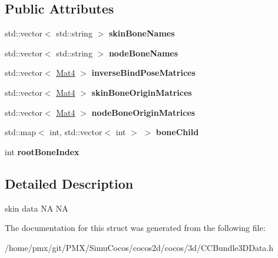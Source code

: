 \subsection*{Public Attributes}
\begin{DoxyCompactItemize}
\item 
\mbox{\label{structSkinData_ad68202d761e4163ceee9eaedf1c5d9aa}} 
std\+::vector$<$ std\+::string $>$ {\bfseries skin\+Bone\+Names}
\item 
\mbox{\label{structSkinData_a46d45c2d864ce9bc19525da8fb0fffdc}} 
std\+::vector$<$ std\+::string $>$ {\bfseries node\+Bone\+Names}
\item 
\mbox{\label{structSkinData_a1d031a1ee552e0412799c911ffc91af8}} 
std\+::vector$<$ \hyperlink{classMat4}{Mat4} $>$ {\bfseries inverse\+Bind\+Pose\+Matrices}
\item 
\mbox{\label{structSkinData_a3162edec71fbbf4b579cbbcb321f801c}} 
std\+::vector$<$ \hyperlink{classMat4}{Mat4} $>$ {\bfseries skin\+Bone\+Origin\+Matrices}
\item 
\mbox{\label{structSkinData_af56f9ccb04635b012bba68f9d6183d68}} 
std\+::vector$<$ \hyperlink{classMat4}{Mat4} $>$ {\bfseries node\+Bone\+Origin\+Matrices}
\item 
\mbox{\label{structSkinData_a0183ca664fd43e1b63dbd0012ed3efd6}} 
std\+::map$<$ int, std\+::vector$<$ int $>$ $>$ {\bfseries bone\+Child}
\item 
\mbox{\label{structSkinData_abd63501dce1f75954e74eb1a77eaccf8}} 
int {\bfseries root\+Bone\+Index}
\end{DoxyCompactItemize}


\subsection{Detailed Description}
skin data  NA  NA 

The documentation for this struct was generated from the following file\+:\begin{DoxyCompactItemize}
\item 
/home/pmx/git/\+P\+M\+X/\+Simu\+Cocos/cocos2d/cocos/3d/C\+C\+Bundle3\+D\+Data.\+h\end{DoxyCompactItemize}
